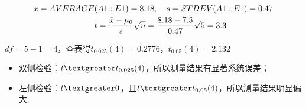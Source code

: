 \documentclass[UTF8]{ctexart}
\begin{document}
 \begin{equation}\notag
 \begin{aligned}
\bar{x}=AVERAGE&(A1:E1)=8.18 ,\quad s=STDEV(A1:E1)=0.47\\
&t=\frac{\bar{x}-\mu_0}{s} \sqrt{n} =\frac{8.18-7.5}{0.47} \sqrt{5}=3.3\\
 \end{aligned}
 \end{equation}

\begin{center}
$df=5-1=4$，查表得$t_{0.025}(4)=0.2776$，$t_{0.05}(4)=2.132$
\end{center}

\begin{itemize}
\item 双侧检验：$t\textgreater t_{0.025}(4)$，所以测量结果有显著系统误差；
\item 左侧检验：$t\textgreater 0$，且$ t \textgreater t_{0.05}(4)$，所以测量结果明显偏大.
\end{itemize}
\end{document}
